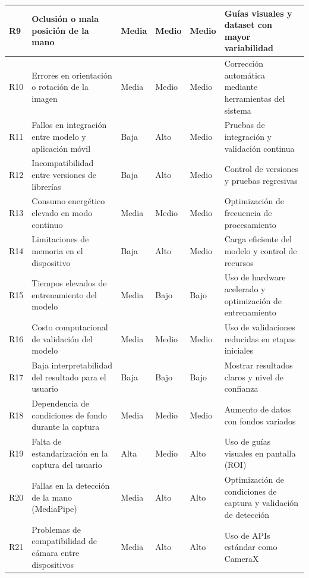\begin{longtable}{|p{1.2cm}|p{4.2cm}|p{1.5cm}|p{1.5cm}|p{1.5cm}|p{4.5cm}|}
		R9 &
		Oclusión o mala posición de la mano &
		Media &
		Medio &
		Medio &
		Guías visuales y dataset con mayor variabilidad \\
		\hline
		
		R10 &
		Errores en orientación o rotación de la imagen &
		Media &
		Medio &
		Medio &
		Corrección automática mediante herramientas del sistema \\
		\hline
		
		R11 &
		Fallos en integración entre modelo y aplicación móvil &
		Baja &
		Alto &
		Medio &
		Pruebas de integración y validación continua \\
		\hline
		
		R12 &
		Incompatibilidad entre versiones de librerías &
		Baja &
		Alto &
		Medio &
		Control de versiones y pruebas regresivas \\
		\hline
		
		R13 &
		Consumo energético elevado en modo continuo &
		Media &
		Medio &
		Medio &
		Optimización de frecuencia de procesamiento \\
		\hline
		
		R14 &
		Limitaciones de memoria en el dispositivo &
		Baja &
		Alto &
		Medio &
		Carga eficiente del modelo y control de recursos \\
		\hline
		
		R15 &
		Tiempos elevados de entrenamiento del modelo &
		Media &
		Bajo &
		Bajo &
		Uso de hardware acelerado y optimización de entrenamiento \\
		\hline
		
		R16 &
		Costo computacional de validación del modelo &
		Media &
		Medio &
		Medio &
		Uso de validaciones reducidas en etapas iniciales \\
		\hline
		
		R17 &
		Baja interpretabilidad del resultado para el usuario &
		Baja &
		Bajo &
		Bajo &
		Mostrar resultados claros y nivel de confianza \\
		\hline
		
		R18 &
		Dependencia de condiciones de fondo durante la captura &
		Media &
		Medio &
		Medio &
		Aumento de datos con fondos variados \\
		\hline
		
		R19 &
		Falta de estandarización en la captura del usuario &
		Alta &
		Medio &
		Alto &
		Uso de guías visuales en pantalla (ROI) \\
		\hline
		
		R20 &
		Fallas en la detección de la mano (MediaPipe) &
		Media &
		Alto &
		Alto &
		Optimización de condiciones de captura y validación de detección \\
		\hline
		
		R21 &
		Problemas de compatibilidad de cámara entre dispositivos &
		Media &
		Alto &
		Alto &
		Uso de APIs estándar como CameraX \\
		\hline
		
	\end{longtable}
